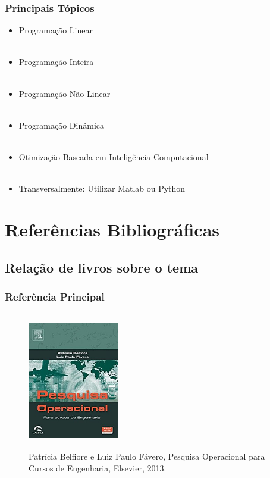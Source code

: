 \documentclass{beamer}
\begin{document}
\begin{frame}
\frametitle{Principais Tópicos}
\begin{itemize}
\item Programação Linear\\~\\

\item Programação Inteira\\~\\

\item Programação Não Linear\\~\\

\item Programação Dinâmica\\~\\

\item Otimização Baseada em Inteligência Computacional\\~\\

\item Transversalmente: Utilizar Matlab ou Python

\end{itemize}
\end{frame}


\section{Referências Bibliográficas}
\subsection{Relação de livros sobre o tema} 

\begin{frame}
\frametitle{Referência Principal}

\begin{figure}[!htb]
\centering
\includegraphics[width=4cm, height=6cm]{pesquisaoperacional-campus.jpg}
\caption{Patrícia Belfiore e Luiz Paulo Fávero, Pesquisa Operacional para Cursos de Engenharia, Elsevier, 2013.}
\end{figure}

\end{frame}
\end{document}
